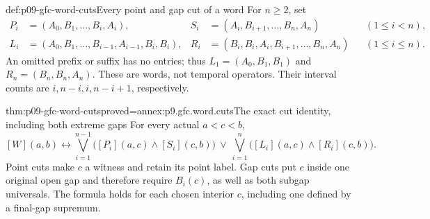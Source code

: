\begin{hbdefinition}{def:p09-gfc-word-cuts}{Every point and gap cut of a word}
For \(n\geq2\), set
\[
\begin{aligned}
 P_i&=(A_0,B_1,\ldots,B_i,A_i),&
 S_i&=(A_i,B_{i+1},\ldots,B_n,A_n)
                          &&(1\leq i<n),\\
 L_i&=(A_0,B_1,\ldots,B_{i-1},A_{i-1},B_i,B_i),&
 R_i&=(B_i,B_i,A_i,B_{i+1},\ldots,B_n,A_n)
                          &&(1\leq i\leq n).
\end{aligned}
\]
An omitted prefix or suffix has no entries; thus
\(L_1=(A_0,B_1,B_1)\) and
\(R_n=(B_n,B_n,A_n)\).
These are words, not temporal operators. Their interval
counts are \(i,n-i,i,n-i+1\), respectively.
\end{hbdefinition}

\begin{hblemma}{thm:p09-gfc-word-cuts}{proved=annex:p9.gfc.word.cuts}{The exact cut identity, including both extreme gaps}
For every actual \(a<c<b\),
\[
 [W](a,b)\longleftrightarrow
 \bigvee_{i=1}^{n-1}\bigl([P_i](a,c)\land[S_i](c,b)\bigr)
 \ \lor\
 \bigvee_{i=1}^{n}\bigl([L_i](a,c)\land[R_i](c,b)\bigr).
\]
Point cuts make \(c\) a witness and retain its point label.
Gap cuts put \(c\) inside one original open gap and therefore
require \(B_i(c)\), as well as both subgap universals.
The formula holds for each chosen interior \(c\), including
one defined by a final-gap supremum.
\end{hblemma}

